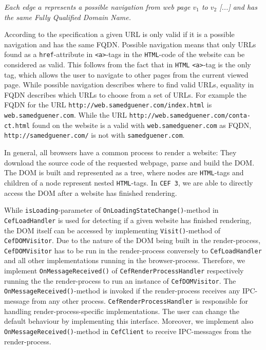 \begin{center}
	\textit{Each edge $a$ represents a possible navigation from web page $v_1$ to $v_2$ [...] and has the same Fully Qualified Domain Name.}
\end{center}

According to the specification a given URL is only valid if it is a possible navigation and has the same FQDN. Possible navigation means that only URLs found as a \texttt{href}-attribute in \texttt{<a>}-tags in the \texttt{HTML}-code of the website can be considered as valid. This follows from the fact that in \texttt{HTML} \texttt{<a>}-tag is the only tag, which allows the user to navigate to other pages from the current viewed page. While possible navigation describes where to find valid URLs, equality in FQDN describes which URLs to choose from a set of URLs.
For example the FQDN for the URL \texttt{http://web.samedguener.com/index.html} is \texttt{web.samedguener.com}. While the URL \texttt{http://web.samedguener.com/conta-
ct.html} found on the website is a valid with \texttt{web.samedguener.com} as FQDN, \texttt{http://samedguener.com/} is not with \texttt{samedguener.com}.

In general, all browsers have a common process to render a website: They download the source code of the requested webpage, parse and build the DOM. The DOM is built and represented as a tree, where nodes are \texttt{HTML}-tags and children of a node represent nested \texttt{HTML}-tags. In \texttt{CEF 3}, we are able to directly access the DOM after a website has finished rendering. 

While \texttt{isLoading}-parameter of \texttt{OnLoadingStateChange()}-method in \texttt{CefLoadHandler} is used for detecting if a given website has finished rendering, the DOM itself can be accessed by implementing \texttt{Visit()}-method of \texttt{CefDOMVisitor}.
Due to the nature of the DOM being built in the render-process, \texttt{CefDOMVisitor} has to be run in the render-process conversely to \texttt{CefLoadHandler} and all other implementations running in the browser-process. Therefore, we implement \texttt{OnMessageReceived()} of \texttt{CefRenderProcessHandler} respectively running the the render-process to run an instance of \texttt{CefDOMVisitor}. The \texttt{OnMessageReceived()}-method is invoked if the render-process receives any IPC-message from any other process. \texttt{CefRenderProcessHandler} is responsible for handling render-process-specific implementations. The user can change the default behaviour by implementing this interface. Moreover, we implement also \texttt{OnMessageReceived()}-method in \texttt{CefClient} to receive IPC-messages from the render-process.

